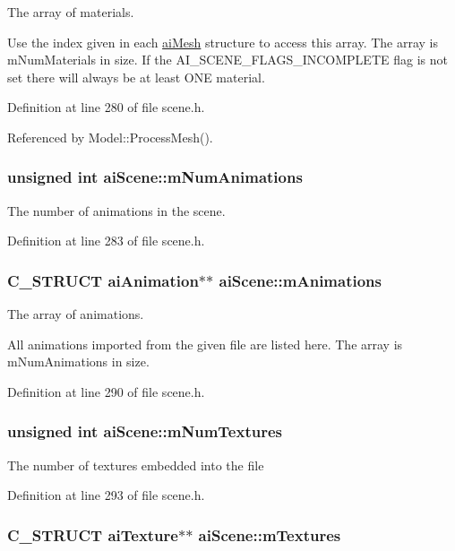The array of materials.

Use the index given in each \hyperlink{structai_mesh}{aiMesh} structure to access this array. The array is mNumMaterials in size. If the AI\_\-SCENE\_\-FLAGS\_\-INCOMPLETE flag is not set there will always be at least ONE material. 

Definition at line 280 of file scene.h.

Referenced by Model::ProcessMesh().\hypertarget{structai_scene_a2af030ec218ead0dc062b6a96a7471a}{
\subsubsection[mNumAnimations]{\setlength{\rightskip}{0pt plus 5cm}unsigned int {\bf aiScene::mNumAnimations}}}
\label{structai_scene_a2af030ec218ead0dc062b6a96a7471a}


The number of animations in the scene. 

Definition at line 283 of file scene.h.\hypertarget{structai_scene_b76fb8f38c2e7365ccce42d565b62b25}{
\subsubsection[mAnimations]{\setlength{\rightskip}{0pt plus 5cm}C\_\-STRUCT {\bf aiAnimation}$\ast$$\ast$ {\bf aiScene::mAnimations}}}
\label{structai_scene_b76fb8f38c2e7365ccce42d565b62b25}


The array of animations.

All animations imported from the given file are listed here. The array is mNumAnimations in size. 

Definition at line 290 of file scene.h.\hypertarget{structai_scene_0d61a5439edd7223097b48aea57c47dd}{
\subsubsection[mNumTextures]{\setlength{\rightskip}{0pt plus 5cm}unsigned int {\bf aiScene::mNumTextures}}}
\label{structai_scene_0d61a5439edd7223097b48aea57c47dd}


The number of textures embedded into the file 

Definition at line 293 of file scene.h.\hypertarget{structai_scene_0fd0d29fbc439e3715b4975ccb68d2d3}{
\subsubsection[mTextures]{\setlength{\rightskip}{0pt plus 5cm}C\_\-STRUCT {\bf aiTexture}$\ast$$\ast$ {\bf aiScene::mTextures}}}
\label{structai_scene_0fd0d29fbc439e3715b4975ccb68d2d3}


